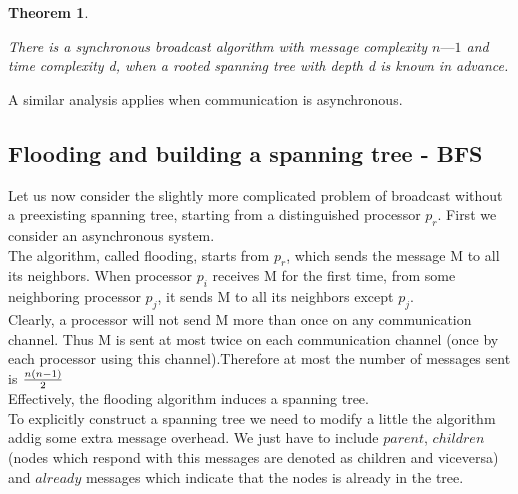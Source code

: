 \documentclass{article}
\newtheorem{thm}{Theorem}[section]
\newenvironment{theorem}{\begin{thm}\begin{rm}}%
{\end{rm}\end{thm}}
\begin{document}
\begin{theorem}
There is a synchronous broadcast algorithm with message complexity 
$n — 1$ and time complexity d, when a rooted spanning tree with depth d is known in 
advance. 
\end{theorem}

A similar analysis applies when communication is asynchronous. 



\subsection{Flooding and building a spanning tree - BFS}
Let us now consider the slightly more complicated problem of broadcast 
without a preexisting spanning tree, starting from a distinguished processor $p_r$. First 
we consider an asynchronous system. \\
The algorithm, called flooding, starts from $p_r$, which sends the message M to all 
its neighbors. When processor $p_i$ receives M for the first time, from some neighboring processor $p_j$, it sends M to all its 
neighbors except $p_j$.\\
Clearly, a processor will not send M more than once on any communication 
channel. Thus M is sent at most twice on each communication channel (once 
by each processor using this channel).Therefore at most the number of messages sent is ${n(n-1) \over 2}$\\
Effectively, the flooding algorithm induces a spanning tree.\\
To explicitly construct a spanning tree we need to modify a little the algorithm addig some extra message overhead. We just have to include $parent$, $children$ (nodes which respond with this messages are denoted as children and viceversa)  and $already$ messages which indicate that the nodes is already in the tree.\\
\end{document}
